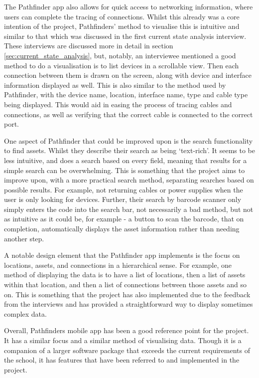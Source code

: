 \documentclass [11pt,a4paper]{article}
\begin{document}
The Pathfinder app also allows for quick access to networking information, where users can complete the tracing of connections. Whilst this already was a core intention of the project, Pathfinders' method to visualise this is intuitive and similar to that which was discussed in the first current state analysis interview. These interviews are discussed more in detail in section \ref{sec:current_state_analysis}, but, notably, an interviewee mentioned a good method to do a visualisation is to list devices in a scrollable view. Then each connection between them is drawn on the screen, along with device and interface information displayed as well. This is also similar to the method used by Pathfinder, with the device name, location, interface name, type and cable type being displayed. This would aid in easing the process of tracing cables and connections, as well as verifying that the correct cable is connected to the correct port.

One aspect of Pathfinder that could be improved upon is the search functionality to find assets. Whilst they describe their search as being `text-rich'. It seems to be less intuitive, and does a search based on every field, meaning that results for a simple search can be overwhelming. This is something that the project aims to improve upon, with a more practical search method, separating searches based on possible results. For example, not returning cables or power supplies when the user is only looking for devices. Further, their search by barcode scanner only simply enters the code into the search bar, not necessarily a bad method, but not as intuitive as it could be, for example - a button to scan the barcode, that on completion, automatically displays the asset information rather than needing another step.

A notable design element that the Pathfinder app implements is the focus on locations, assets, and connections in a hierarchical sense. For example, one method of displaying the data is to have a list of locations, then a list of assets within that location, and then a list of connections between those assets and so on. This is something that the project has also implemented due to the feedback from the interviews and has provided a straightforward way to display sometimes complex data.

Overall, Pathfinders mobile app has been a good reference point for the project. It has a similar focus and a similar method of visualising data. Though it is a companion of a larger software package that exceeds the current requirements of the school, it has features that have been referred to and implemented in the project.  
\end{document}
